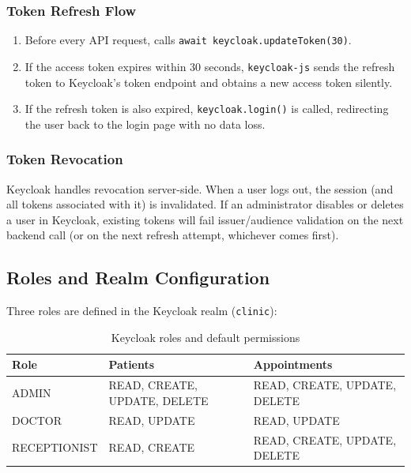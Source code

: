 \documentclass[12pt,a4paper]{report}
\begin{document}
\subsubsection{Token Refresh Flow}

\begin{enumerate}
  \item Before every API request,  calls
        \texttt{await keycloak.\allowbreak{}updateToken(30)}.
  \item If the access token expires within 30 seconds, \texttt{keycloak-js} sends the refresh
        token to Keycloak's token endpoint and obtains a new access token silently.
  \item If the refresh token is also expired, \texttt{keycloak.login()} is called, redirecting
        the user back to the login page with no data loss.
\end{enumerate}

\subsubsection{Token Revocation}

Keycloak handles revocation server-side. When a user logs out, the session (and all tokens
associated with it) is invalidated. If an administrator disables or deletes a user in
Keycloak, existing tokens will fail issuer/audience validation on the next backend call
(or on the next refresh attempt, whichever comes first).

\subsection{Roles and Realm Configuration}

Three roles are defined in the Keycloak realm (\texttt{clinic}):

\begin{table}[H]
\centering
\caption{Keycloak roles and default permissions}
\begin{tabularx}{\linewidth}{l X X}
\toprule
\textbf{Role}       & \textbf{Patients}              & \textbf{Appointments} \\
\midrule
ADMIN               & READ, CREATE, UPDATE, DELETE   & READ, CREATE, UPDATE, DELETE \\
DOCTOR              & READ, UPDATE                   & READ, UPDATE \\
RECEPTIONIST        & READ, CREATE                   & READ, CREATE, UPDATE, DELETE \\
\bottomrule
\end{tabularx}
\end{table}
\end{document}
